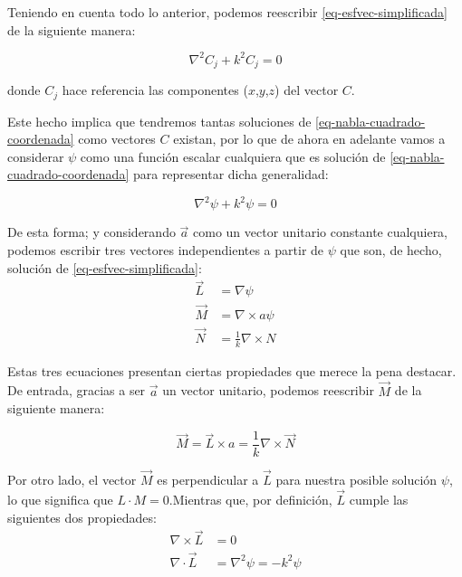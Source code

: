 Teniendo en cuenta todo lo anterior, podemos reescribir \eqref{eq-esfvec-simplificada} de la siguiente manera:

\begin{equation}
\nabla^2C_{j} + k^2C_{j} = 0
\label{eq-nabla-cuadrado-coordenada}
\end{equation}

donde $C_{j}$ hace referencia las componentes ($x$,$y$,$z$) del vector $C$.
\\

\newpage

Este hecho implica que tendremos tantas soluciones de \eqref{eq-nabla-cuadrado-coordenada} como vectores $C$ existan, por lo que de ahora en adelante vamos a considerar $\psi$ como una función escalar cualquiera que es solución de \eqref{eq-nabla-cuadrado-coordenada} para representar dicha generalidad:

\begin{equation}
\nabla^2\psi + k^2\psi = 0
\label{eq-nabla-cuadrado-coordenada-con-una-soculicon-por-vector-C}
\end{equation}

De esta forma; y considerando $\vec{a}$ como un vector unitario constante cualquiera, podemos escribir tres vectores independientes a partir de $\psi$ que son, de hecho, solución de \eqref{eq-esfvec-simplificada}:
\begin{subequations}
\begin{align}
    \vec{L}&= \nabla\psi \label{eq:Lirrotacional}\\
    \vec{M}&= \nabla\times a\psi\\
    \vec{N}&=\frac{1}{k}\nabla\times N
\end{align}
\end{subequations}

Estas tres ecuaciones presentan ciertas propiedades que merece la pena destacar. De entrada, gracias a ser $\vec{a}$ un vector unitario, podemos reescribir $\vec{M}$ de la siguiente manera:    

\begin{equation}
\vec{M}= \vec{L} \times a = \frac{1}{k}\nabla \times \vec{N}
\label{eq-M-reescrito}
\end{equation}


Por otro lado, el vector $\vec{M}$ es perpendicular a $\vec{L}$ para nuestra posible solución $\psi$, lo que significa que $L\cdot M=0$.Mientras que, por definición, $\vec{L}$ cumple las siguientes dos propiedades:
\begin{align}
    \nabla  \times \vec{L} &=0 \\
    \nabla  \cdot \vec{L}  &=\nabla^2\psi = -k^2 \psi
\end{align}

